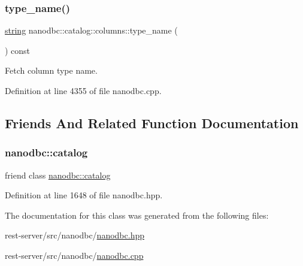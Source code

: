 \subsubsection{\texorpdfstring{type\_name()}{type\_name()}}
{\footnotesize\ttfamily \mbox{\hyperlink{namespacenanodbc_abfc0ece56278e590911ec8352774c212}{string}} nanodbc\+::catalog\+::columns\+::type\+\_\+name (\begin{DoxyParamCaption}{ }\end{DoxyParamCaption}) const}



Fetch column type name. 



Definition at line 4355 of file nanodbc.\+cpp.



\subsection{Friends And Related Function Documentation}
\mbox{\label{classnanodbc_1_1catalog_1_1columns_af0f3134c7f6f1f36bfe1e247318dfe43}} 
\subsubsection{\texorpdfstring{nanodbc::catalog}{nanodbc::catalog}}
{\footnotesize\ttfamily friend class \mbox{\hyperlink{classnanodbc_1_1catalog}{nanodbc\+::catalog}}\hspace{0.3cm}{\ttfamily [friend]}}



Definition at line 1648 of file nanodbc.\+hpp.



The documentation for this class was generated from the following files\+:\begin{DoxyCompactItemize}
\item 
rest-\/server/src/nanodbc/\mbox{\hyperlink{nanodbc_8hpp}{nanodbc.\+hpp}}\item 
rest-\/server/src/nanodbc/\mbox{\hyperlink{nanodbc_8cpp}{nanodbc.\+cpp}}\end{DoxyCompactItemize}
